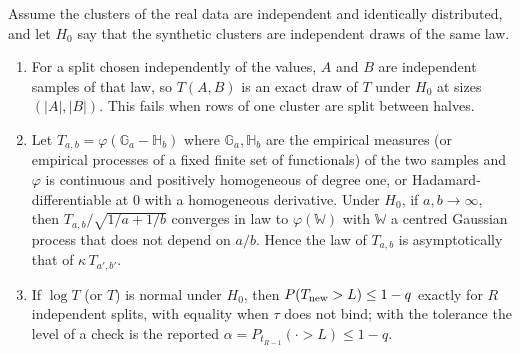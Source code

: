 \begin{proposition}\label{prop:splitnull}
Assume the clusters of the real data are independent and identically distributed, and let $H_0$ say that the synthetic clusters are independent draws of the same law.
\begin{enumerate}
\item[(a)] For a split chosen independently of the values, $A$ and $B$ are independent samples of that law, so $T(A,B)$ is an exact draw of $T$ under $H_0$ at sizes $(|A|,|B|)$. This fails when rows of one cluster are split between halves.
\item[(b)] Let $T_{a,b}=\varphi(\mathbb{G}_a-\mathbb{H}_b)$ where $\mathbb{G}_a,\mathbb{H}_b$ are the empirical measures (or empirical processes of a fixed finite set of functionals) of the two samples and $\varphi$ is continuous and positively homogeneous of degree one, or Hadamard-differentiable at $0$ with a homogeneous derivative. Under $H_0$, if $a,b\to\infty$, then $T_{a,b}/\sqrt{1/a+1/b}$ converges in law to $\varphi(\mathbb{W})$ with $\mathbb{W}$ a centred Gaussian process that does not depend on $a/b$. Hence the law of $T_{a,b}$ is asymptotically that of $\kappa\,T_{a',b'}$.
\item[(c)] If $\log T$ (or $T$) is normal under $H_0$, then $P(T_{\rm new}>L)\le 1-q$ exactly for $R$ independent splits, with equality when $\tau$ does not bind; with the tolerance the level of a check is the reported $\alpha=P_{t_{R-1}}(\cdot>L)\le 1-q$.
\end{enumerate}
\end{proposition}
